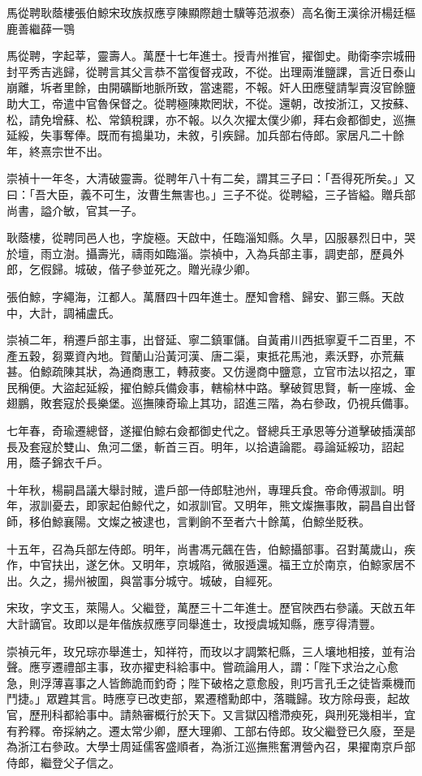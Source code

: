 
\begin{pinyinscope}
馬從聘耿蔭樓張伯鯨宋玫族叔應亨陳顯際趙士驥等范淑泰）高名衡王漢徐汧楊廷樞鹿善繼薛一鶚

馬從聘，字起莘，靈壽人。萬歷十七年進士。授青州推官，擢御史。勛衛李宗城冊封平秀吉逃歸，從聘言其父言恭不當復督戎政，不從。出理兩淮鹽課，言近日泰山崩離，坼者里餘，由開礦斷地脈所致，當速罷，不報。奸人田應璧請掣賣沒官餘鹽助大工，帝遣中官魯保督之。從聘極陳欺罔狀，不從。還朝，改按浙江，又按蘇、松，請免增蘇、松、常鎮稅課，亦不報。以久次擢太僕少卿，拜右僉都御史，巡撫延綏，失事奪俸。既而有搗巢功，未敘，引疾歸。加兵部右侍郎。家居凡二十餘年，終熹宗世不出。

崇禎十一年冬，大清破靈壽。從聘年八十有二矣，謂其三子曰：「吾得死所矣。」又曰：「吾大臣，義不可生，汝曹生無害也。」三子不從。從聘縊，三子皆縊。贈兵部尚書，謚介敏，官其一子。

耿蔭樓，從聘同邑人也，字旋極。天啟中，任臨淄知縣。久旱，囚服暴烈日中，哭於壇，雨立澍。攝壽光，禱雨如臨淄。崇禎中，入為兵部主事，調吏部，歷員外郎，乞假歸。城破，偕子參並死之。贈光祿少卿。

張伯鯨，字繩海，江都人。萬曆四十四年進士。歷知會稽、歸安、鄞三縣。天啟中，大計，調補盧氏。

崇禎二年，稍遷戶部主事，出督延、寧二鎮軍儲。自黃甫川西抵寧夏千二百里，不產五穀，芻粟資內地。賀蘭山沿黃河漢、唐二渠，東抵花馬池，素沃野，亦荒蕪甚。伯鯨疏陳其狀，為通商惠工，轉菽麥。又仿邊商中鹽意，立官市法以招之，軍民稱便。大盜起延綏，擢伯鯨兵備僉事，轄榆林中路。擊破賀思賢，斬一座城、金翅鵬，敗套寇於長樂堡。巡撫陳奇瑜上其功，詔進三階，為右參政，仍視兵備事。

七年春，奇瑜遷總督，遂擢伯鯨右僉都御史代之。督總兵王承恩等分道擊破插漢部長及套寇於雙山、魚河二堡，斬首三百。明年，以拾遺論罷。尋論延綏功，詔起用，蔭子錦衣千戶。

十年秋，楊嗣昌議大舉討賊，遣戶部一侍郎駐池州，專理兵食。帝命傅淑訓。明年，淑訓憂去，即家起伯鯨代之，如淑訓官。又明年，熊文燦撫事敗，嗣昌自出督師，移伯鯨襄陽。文燦之被逮也，言剿餉不至者六十餘萬，伯鯨坐貶秩。

十五年，召為兵部左侍郎。明年，尚書馮元飆在告，伯鯨攝部事。召對萬歲山，疾作，中官扶出，遂乞休。又明年，京城陷，微服遁還。福王立於南京，伯鯨家居不出。久之，揚州被圍，與當事分城守。城破，自經死。

宋玫，字文玉，萊陽人。父繼登，萬歷三十二年進士。歷官陜西右參議。天啟五年大計謫官。玫即以是年偕族叔應亨同舉進士，玫授虞城知縣，應亨得清豐。

崇禎元年，玫兄琮亦舉進士，知祥符，而玫以才調繁杞縣，三人壤地相接，並有治聲。應亨遷禮部主事，玫亦擢吏科給事中。嘗疏論用人，謂：「陛下求治之心愈急，則浮薄喜事之人皆飾詭而釣奇；陛下破格之意愈殷，則巧言孔壬之徒皆乘機而鬥捷。」眾韙其言。時應亨已改吏部，累遷稽勳郎中，落職歸。玫方除母喪，起故官，歷刑科都給事中。請熱審概行於天下。又言獄囚稽滯瘐死，與刑死幾相半，宜有矜釋。帝採納之。遷太常少卿，歷大理卿、工部右侍郎。玫父繼登已久廢，至是為浙江右參政。大學士周延儒客盛順者，為浙江巡撫熊奮渭營內召，果擢南京戶部侍郎，繼登父子信之。


\end{pinyinscope}

